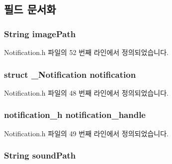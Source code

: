 \subsection{필드 문서화}
\hypertarget{structNotificationExtend_a7480fd65ec0c3010b75b111ed2611adb}{
\subsubsection[{image\-Path}]{\setlength{\rightskip}{0pt plus 5cm}String image\-Path}}\label{structNotificationExtend_a7480fd65ec0c3010b75b111ed2611adb}


Notification.\-h 파일의 52 번째 라인에서 정의되었습니다.

\hypertarget{structNotificationExtend_a7e3b5846fc96caa1bf325b063f5b56ec}{
\subsubsection[{notification}]{\setlength{\rightskip}{0pt plus 5cm}struct {\bf \-\_\-\-Notification} notification}}\label{structNotificationExtend_a7e3b5846fc96caa1bf325b063f5b56ec}


Notification.\-h 파일의 48 번째 라인에서 정의되었습니다.

\hypertarget{structNotificationExtend_a1c5a3131495086704fd49c62b63f95d6}{
\subsubsection[{notification\-\_\-handle}]{\setlength{\rightskip}{0pt plus 5cm}notification\-\_\-h notification\-\_\-handle}}\label{structNotificationExtend_a1c5a3131495086704fd49c62b63f95d6}


Notification.\-h 파일의 49 번째 라인에서 정의되었습니다.

\hypertarget{structNotificationExtend_ac2d6721b778cd06197fc40a5595c54e1}{
\subsubsection[{sound\-Path}]{\setlength{\rightskip}{0pt plus 5cm}String sound\-Path}}\label{structNotificationExtend_ac2d6721b778cd06197fc40a5595c54e1}


